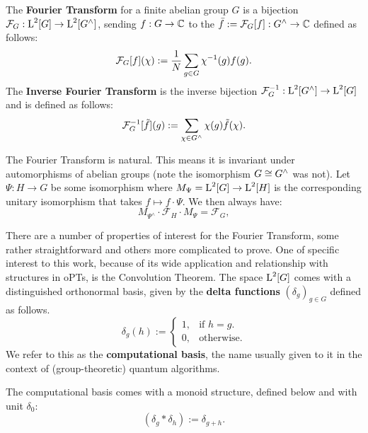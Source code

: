 \begin{defn}
The \textbf{Fourier Transform} for a finite abelian group $G$ is a bijection $\mathcal{F}_G:\operatorname{L}^2[G]\rightarrow\operatorname{L}^2[G^\wedge]$, sending $f:G\to\mathbb{C}$ to the $\bar{f}:=\mathcal{F}_G[f]:G^\wedge\to\mathbb{C}$ defined as follows:
\begin{equation}\label{eqn:DefTraditionalFT}
  \mathcal{F}_G[f](\chi) := \frac{1}{N}\sum_{g \in G}\chi^{-1}(g)f(g).
\end{equation}
The \textbf{Inverse Fourier Transform} is the inverse bijection $\mathcal{F}_G^{-1}: \operatorname{L}^2[G^\wedge] \rightarrow \operatorname{L}^2[G]$ and is defined as follows:
\begin{equation}\label{eqn:DefTraditionalInverseFT}
  \mathcal{F}_G^{-1}[\tilde{f}](g) := \sum_{\chi \in G^\wedge}\chi(g)\tilde{f}(\chi).
\end{equation}
\end{defn}

The Fourier Transform is natural.  This means it is invariant under automorphisms of abelian groups (note the isomorphism $G \cong G^\wedge$ was not). Let $\Psi : H \rightarrow G$ be some isomorphism where $M_\Psi = \operatorname{L}^2[G] \rightarrow \operatorname{L}^2[H]$ is the corresponding unitary isomorphism that takes $f\mapsto f\cdot \Psi$. We then always have:
\begin{equation}\label{eqn:FTcanonicity}
  M_{\Psi^\wedge} \cdot \mathcal{F}_H \cdot M_\Psi =  \mathcal{F}_G,
\end{equation}

There are a number of properties of interest for the Fourier Transform, some rather straightforward and others more complicated to prove. One of specific interest to this work, because of its wide application and relationship with structures in oPTs, is the Convolution Theorem. The space $\operatorname{L}^2[G]$ comes with a distinguished orthonormal basis, given by the \textbf{delta functions} $(\delta_g)_{g\in G}$ defined as follows.
\begin{equation}
\label{eqn:computationalBasis}
  \delta_g(h):=\begin{cases}
    1, & \text{if $h=g$}.\\
    0, & \text{otherwise}.
  \end{cases}
\end{equation}
We refer to this as the \textbf{computational basis}, the name usually given to it in the context of (group-theoretic) quantum algorithms.

The computational basis comes with a monoid structure, defined below and with unit $\delta_0$:
\begin{equation}
  \left(\delta_g*\delta_h\right):=\delta_{g+h}.
\end{equation}

